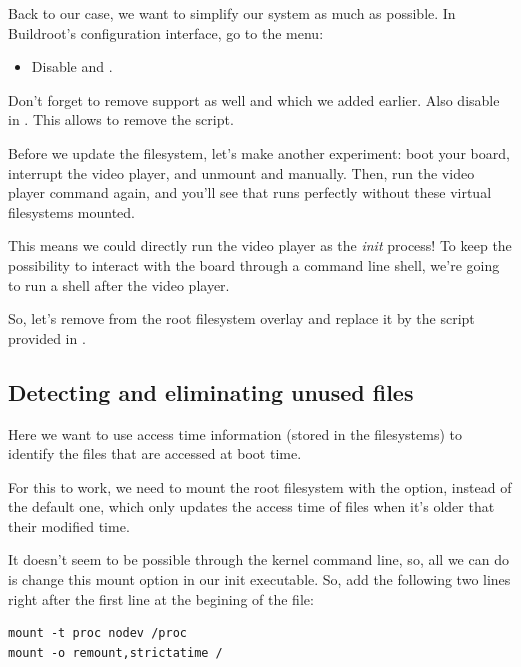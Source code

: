 Back to our case, we want to simplify our system as much as possible.
In Buildroot's configuration interface, go to the  menu:

\begin{itemize}
\item Disable  and
      .
\end{itemize}

Don't forget to remove  support as well and
 which we added earlier.
Also disable  in .
This allows to remove the  script.

Before we update the filesystem, let's make another experiment: boot
your board, interrupt the video player, and unmount  and
 manually. Then, run the video player command again, and
you'll see that  runs perfectly without these virtual
filesystems mounted.

This means we could directly run the video player as the {\em init}
process! To keep the possibility to interact with the board through
a command line shell, we're going to run a shell after the video player.

So, let's remove  from the root
filesystem overlay and replace it by the  script
provided in .

\subsection{Detecting and eliminating unused files}

Here we want to use access time information (stored in the filesystems)
to identify the files that are accessed at boot time.

For this to work, we need to mount the root filesystem with the
 option, instead of the default  one,
which only updates the access time of files when it's older that their
modified time.

It doesn't seem to be possible through the kernel command line, so,
all we can do is change this mount option in our init executable.
So, add the following two lines right after the first line at
the begining of the  file:

\begin{verbatim}
mount -t proc nodev /proc
mount -o remount,strictatime /
\end{verbatim}

